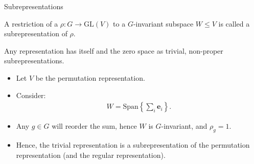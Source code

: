\documentclass[handout, 10pt]{beamer}
\newcommand{\GL}{\text{GL}}
\newcommand{\bas}{\mathbf{e}}
\newcommand{\Span}{\text{Span}}
\begin{document}
\begin{frame}[allowframebreaks]{Subrepresentations}
		\begin{definition}[Subrepresentation]
			A restriction of a $\rho: G \rightarrow \GL(V)$ to a $G$-invariant subspace $W \leq V$ is called a subrepresentation of $\rho$.
		\end{definition}
		
		\begin{example}
			Any representation has itself and the zero space as trivial, non-proper subrepresentations.
		\end{example}

		\begin{example}
			\begin{itemize}
				\item Let $V$ be the permutation representation. 
				
				\item Consider:
				\begin{align*}
					W = \Span\left\lbrace \sum_i \bas_i \right\rbrace.
				\end{align*}
				
				\item Any $g \in G$ will reorder the sum, hence $W$ is $G$-invariant, and $\rho_g = 1$.
				
				\item Hence, the trivial representation is a subrepresentation of the permutation representation (and the regular representation).
			\end{itemize}		
		\end{example}
	\end{frame}
	
\end{document}

